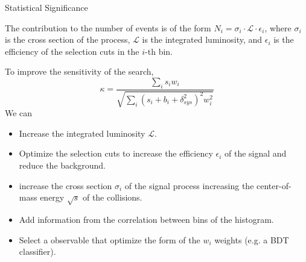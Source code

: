 \documentclass{../../bredelebeamer}
\begin{document}
\begin{frame}{Statistical Significance}
    

    The contribution to the number of events is of the form $N_i = \sigma_i \cdot \mathcal{L} \cdot \epsilon_i$, where $\sigma_i$ is the cross section of the process, $\mathcal{L}$ is the integrated luminosity, and $\epsilon_i$ is the efficiency of the selection cuts in the $i$-th bin.

    To improve the sensitivity of the search, 
    \begin{equation}
        \kappa = \frac{\sum_i s_i w_i}{\sqrt{\sum_i (s_i + b_i + \delta_{sys}^2)^2 w_i^2}}
    \end{equation}
    We can
    \begin{itemize}
        \item Increase the integrated luminosity $\mathcal{L}$.
        \item Optimize the selection cuts to increase the efficiency $\epsilon_i$ of the signal and reduce the background.
        \item increase the cross section $\sigma_i$ of the signal process increasing the center-of-mass energy $\sqrt{s}$ of the collisions.
        \item Add information from the correlation between bins of the histogram.
        \item Select a observable that optimize the form of the $w_i$ weights (e.g. a BDT classifier).
    \end{itemize}
    
\end{frame}
\end{document}
